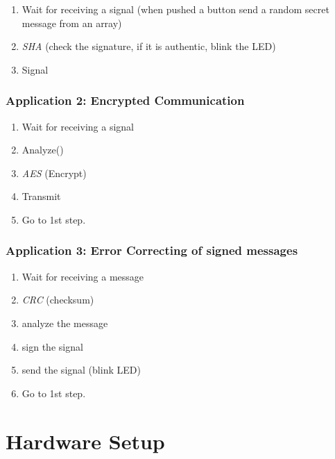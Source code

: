 \documentclass[]{article}
\providecommand{\tightlist}{%
  \setlength{\itemsep}{0pt}\setlength{\parskip}{0pt}}
\begin{document}
\begin{enumerate}
\def\labelenumi{\arabic{enumi}.}
\tightlist
\item
  Wait for receiving a signal (when pushed a button send a random secret message from an array)
\item
  \emph{SHA} (check the signature, if it is authentic, blink the LED)
\item
  Signal
\end{enumerate}

\hypertarget{app-2}{%
\subsubsection*{Application 2: Encrypted Communication}\label{app-2}}

\begin{enumerate}
\def\labelenumi{\arabic{enumi}.}
\tightlist
\item
  Wait for receiving a signal
\item
  Analyze()
\item
  \emph{AES} (Encrypt)
\item
  Transmit
\item
  Go to 1st step.
\end{enumerate}

\hypertarget{application-3-error-correcting-of-signed-messages}{%
\subsubsection*{Application 3: Error Correcting of signed messages}\label{application-3-error-correcting-of-signed-messages}}

\begin{enumerate}
\def\labelenumi{\arabic{enumi}.}
\tightlist
\item
  Wait for receiving a message
\item
  \emph{CRC} (checksum)
\item
  analyze the message
\item
  sign the signal
\item
  send the signal (blink LED)
\item
  Go to 1st step.
\end{enumerate}

\hypertarget{hardware-setup}{%
\section{Hardware Setup}\label{hardware-setup}}
\end{document}
